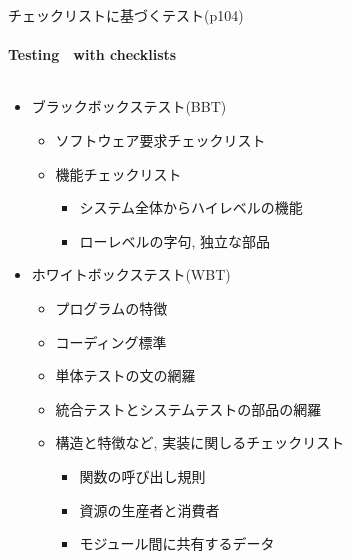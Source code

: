 
\begin{frame}[shrink=15]{チェックリストに基づくテスト(p104)}
\framesubtitle{Testing　with checklists}
\begin{columns}[t]
    \begin{column}{.6\textwidth}
    \begin{itemize}
    \item ブラックボックステスト(BBT)
        \begin{itemize}
        \item ソフトウェア要求チェックリスト
        \item 機能チェックリスト
            \begin{itemize}
            \item システム全体からハイレベルの機能
            \item ローレベルの字句, 独立な部品
            \end{itemize}
        \end{itemize}
    \item ホワイトボックステスト(WBT)
        \begin{itemize}
        \item プログラムの特徴
        \item コーディング標準
        \item 単体テストの文の網羅
        \item 統合テストとシステムテストの部品の網羅
        \item 構造と特徴など, 実装に関しるチェックリスト
            \begin{itemize}
            \item 関数の呼び出し規則
            \item 資源の生産者と消費者
            \item モジュール間に共有するデータ
            \end{itemize}
        \end{itemize}
    \end{itemize}
    \end{column}
        \begin{column}{.35\textwidth}

\end{column}
\end{columns}
\end{frame}
